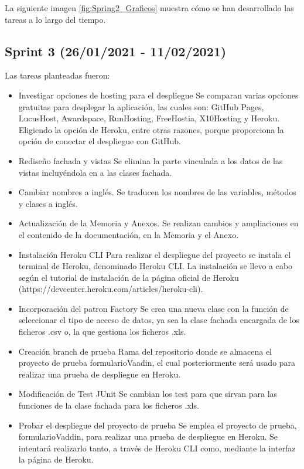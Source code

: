 La siguiente imagen \ref{fig:Spring2_Graficos} muestra cómo se han desarrollado las tareas a lo largo del tiempo.


\subsection{Sprint 3 (26/01/2021 - 11/02/2021)}

Las tareas planteadas fueron:
\begin{itemize}
	\tightlist
	\item Investigar opciones de hosting para el despliegue
	Se comparan varias opciones gratuitas para desplegar la aplicación, las cuales son: GitHub Pages, LucusHost, Awardspace, RunHosting, FreeHostia, X10Hosting y Heroku. Eligiendo la opción de Heroku, entre otras razones, porque proporciona la opción de conectar el despliegue con GitHub.
	\item Rediseño fachada y vistas
	Se elimina la parte vinculada a los datos de las vistas incluyéndola en a las clases fachada. 
	\item Cambiar nombres a inglés.
	Se traducen los nombres de las variables, métodos y clases a inglés.
	\item Actualización de la Memoria y Anexos.
	Se realizan cambios y ampliaciones en el contenido de la documentación, en la Memoria y el Anexo.
	\item Instalación Heroku CLI
	Para realizar el despliegue del proyecto se instala el terminal de Heroku, denominado Heroku CLI. La instalación se llevo a cabo según el tutorial de instalación de la página oficial de Heroku (https://devcenter.heroku.com/articles/heroku-cli).
	\item Incorporación del patron Factory 
	Se crea una nueva clase con la función de seleccionar el tipo de acceso de datos, ya sea la clase fachada encargada de los ficheros .csv o, la que gestiona los ficheros .xls.
	\item Creación branch de prueba
	Rama del repositorio donde se almacena el proyecto de prueba formularioVaadin, el cual posteriormente será usado para realizar una prueba de despliegue en Heroku.
	\item Modificación de Test JUnit
	Se cambian los test para que sirvan para las funciones de la clase fachada para los ficheros .xls. 
	\item Probar el despliegue del proyecto de prueba
	Se emplea el proyecto de prueba, formularioVaddin, para realizar una prueba de despliegue en Heroku. Se intentará realizarlo tanto, a través de Heroku CLI como, mediante la interfaz la página de Heroku.
	
\end{itemize}

